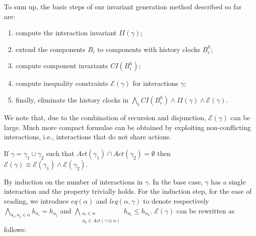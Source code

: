 \documentclass{LMCS}
\newcommand{\actions}{\mathit{Act}}
\newcommand{\eqs}{\mathcal{E}}
\newcommand{\cn}{\mathit{B}\xspace}
\newcommand{\ic}{\mathit{CI}}
\newcommand{\iim}{\mathit{II}}
\theoremstyle{plain}\newtheorem{remark}[thm]{Remark}
\theoremstyle{plain}\newtheorem{example}[thm]{Example}
\begin{document}
\noindent To sum up, the basic steps of our invariant generation method described so far are: 
\begin{enumerate}
\item compute the interaction invariant $\iim(\gamma)$;
\item extend the components $\cn_i$ to components with history clocks
  $\cn_i^h$;
\item compute component invariants $\ic(\cn_i^h)$;
\item compute inequality constraints $\eqs(\gamma)$ for interactions
  $\gamma$;
\item finally, eliminate the history clocks in $\bigwedge_i \ic(
  \cn_i^{h}) \wedge \iim(\gamma) \wedge \eqs(\gamma)$.
\end{enumerate}
We note that, due to the combination of recursion and disjunction,
$\eqs(\gamma)$ can be large. Much more compact formulae can be
obtained by exploiting non-conflicting interactions, i.e.,
interactions that do not share actions.
\begin{prop}
 \label{p:eqsDisj}
 If $\gamma = \gamma_1 \cup \gamma_2$ such that $\actions(\gamma_1) \cap
 \actions(\gamma_2) = \emptyset$ then $\eqs(\gamma) \equiv \eqs(\gamma_1)
 \wedge \eqs(\gamma_2)$.
\end{prop}
\proof By induction on the number of interactions in $\gamma$. In the
base case, $\gamma$ has a single interaction and the property trivially
holds.  For the induction step, for the ease of reading, we introduce
$eq(\alpha)$ and $leq(\alpha,\gamma)$ to denote respectively
$\bigwedge_{a_i,a_j\in \alpha} h_{a_i} = h_{a_j}$ and
$\bigwedge_{\substack{a_i\in \alpha \\ a_k \in \actions(\gamma\ominus
    \alpha)}} h_{a_i} \le h_{a_k}$. $\eqs(\gamma)$ can be rewritten as follows:
\end{document}
